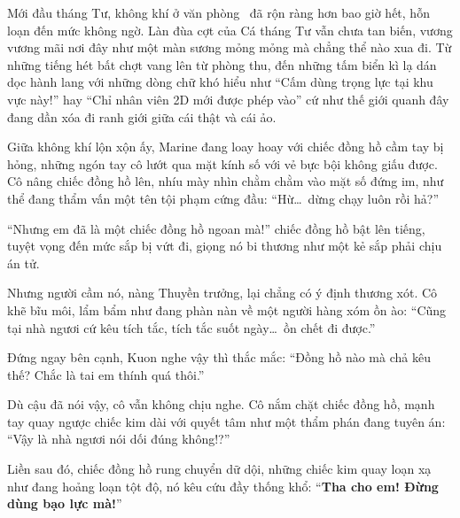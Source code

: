 \documentclass[../main.tex]{subfiles}
\begin{document}
\color{black}


Mới đầu tháng Tư, không khí ở văn phòng \hll\ đã rộn ràng hơn bao giờ hết, hỗn loạn đến mức không ngờ. Làn đùa cợt của Cá tháng Tư vẫn chưa tan biến, vương vương mãi nơi đây như một màn sương mỏng mỏng mà chẳng thể nào xua đi. Từ những tiếng hét bất chợt vang lên từ phòng thu, đến những tấm biển kì lạ dán dọc hành lang với những dòng chữ khó hiểu như ``Cấm dùng trọng lực tại khu vực này!'' hay ``Chỉ nhân viên 2D mới được phép vào'' cứ như thế giới quanh đây đang dần xóa đi ranh giới giữa cái thật và cái ảo.

Giữa không khí lộn xộn ấy, Marine đang loay hoay với chiếc đồng hồ cầm tay bị hỏng, những ngón tay cô lướt qua mặt kính số với vẻ bực bội không giấu được. Cô nâng chiếc đồng hồ lên, nhíu mày nhìn chằm chằm vào mặt số đứng im, như thể đang thẩm vấn một tên tội phạm cứng đầu: ``Hừ\dots\ dừng chạy luôn rồi hả?''

``Nhưng em đã là một chiếc đồng hồ ngoan mà!'' chiếc đồng hồ bật lên tiếng, tuyệt vọng đến mức sắp bị vứt đi, giọng nó bi thương như một kẻ sắp phải chịu án tử.

Nhưng người cầm nó, nàng Thuyền trưởng, lại chẳng có ý định thương xót. Cô khẽ bĩu môi, lẩm bẩm như đang phàn nàn về một người hàng xóm ồn ào: ``Cũng tại nhà ngươi cứ kêu tích tắc, tích tắc suốt ngày\dots\ ồn chết đi được.''

Đứng ngay bên cạnh, Kuon nghe vậy thì thắc mắc: ``Đồng hồ nào mà chả kêu thế? Chắc là tai em thính quá thôi.''

Dù cậu đã nói vậy, cô vẫn không chịu nghe. Cô nắm chặt chiếc đồng hồ, mạnh tay quay ngược chiếc kim dài với quyết tâm như một thẩm phán đang tuyên án: ``Vậy là nhà ngươi nói dối đúng không!?''

Liền sau đó, chiếc đồng hồ rung chuyển dữ dội, những chiếc kim quay loạn xạ như đang hoảng loạn tột độ, nó kêu cứu đầy thống khổ: ``\textbf{Tha cho em! Đừng dùng bạo lực mà!}''
\end{document}
